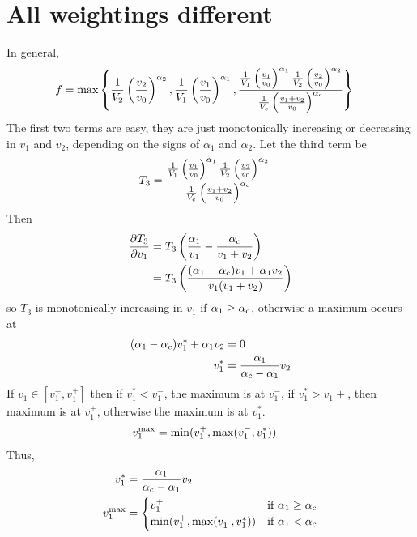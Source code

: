 \documentclass{article}
\begin{document}
\section{All weightings different}

In general,
\begin{align}
  f &= \max\left\{
    \frac{1}{V_2} \left(\frac{v_2}{v_0}\right)^{\alpha_2},
    \frac{1}{V_1} \left(\frac{v_1}{v_0}\right)^{\alpha_1},
    \frac{\frac{1}{V_1} \left(\frac{v_1}{v_0}\right)^{\alpha_1}
      \frac{1}{V_2} \left(\frac{v_2}{v_0}\right)^{\alpha_2}}{
      \frac{1}{V_{\rm c}} \left(\frac{v_1 + v_2}{v_0}\right)^{\alpha_{\rm c}}}
  \right\}
\end{align}
The first two terms are easy, they are just monotonically increasing
or decreasing in $v_1$ and $v_2$, depending on the signs of $\alpha_1$
and $\alpha_2$. Let the third term be
\begin{align}
  T_3 &= \frac{\frac{1}{V_1} \left(\frac{v_1}{v_0}\right)^{\alpha_1}
    \frac{1}{V_2} \left(\frac{v_2}{v_0}\right)^{\alpha_2}}{
    \frac{1}{V_{\rm c}} \left(\frac{v_1 + v_2}{v_0}\right)^{\alpha_{\rm c}}}
\end{align}
Then
\begin{align}
  \frac{\partial T_3}{\partial v_1} &=
  T_3 \left(\frac{\alpha_1}{v_1} - \frac{\alpha_{\rm c}}{v_1+v_2}\right) \\
  &= T_3 \left(\frac{(\alpha_1 - \alpha_{\rm c}) v_1 + \alpha_1 v_2}{
      v_1 (v_1 + v_2)}\right)
\end{align}
so $T_3$ is monotonically increasing in $v_1$ if $\alpha_1 \ge
\alpha_{\rm c}$, otherwise a maximum occurs at
\begin{align}
  (\alpha_1 - \alpha_{\rm c}) v_1^* + \alpha_1 v_2 &= 0 \\
  v_1^* &= \frac{\alpha_1}{\alpha_{\rm c} - \alpha_1} v_2
\end{align}
If $v_1 \in [v_1^-,v_1^+]$ then if $v_1^* < v_1^-$, the maximum is at
$v_1^-$, if $v_1^* > v_1+$, then maximum is at $v_1^+$, otherwise the
maximum is at $v_1^*$.
\begin{align}
  v_1^{\rm max} &= \min(v_1^+, \max(v_1^-, v_1^*))
\end{align}
Thus,
\begin{align}
  v_1^* &= \frac{\alpha_1}{\alpha_{\rm c} - \alpha_1} v_2 \\
  v_1^{\rm max} &= \begin{cases}
    v_1^+ & \text{if } \alpha_1 \ge \alpha_{\rm c} \\
    \min(v_1^+, \max(v_1^-, v_1^*)) & \text{if } \alpha_1 < \alpha_{\rm c}
    \end{cases}
\end{align}
\end{document}
